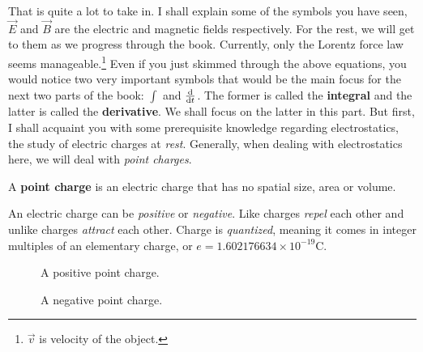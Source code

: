 That is quite a lot to take in. I shall explain some of the symbols you have seen, \(\vec{E}\) and \(\vec{B}\) are the electric and magnetic fields respectively. For the rest, we will get to them as we progress through the book. Currently, only the Lorentz force law seems manageable.\footnote{\(\vec{v}\) is velocity of the object.} Even if you just skimmed through the above equations, you would notice two very important symbols that would be the main focus for the next two parts of the book: \(\int\) and \(\odv{}{t}\). The former is called the \textbf{integral} and the latter is called the \textbf{derivative}. We shall focus on the latter in this part. But first, I shall acquaint you with some prerequisite knowledge regarding electrostatics, the study of electric charges at \emph{rest}. Generally, when dealing with electrostatics here, we will deal with \emph{point charges}.
\begin{definition}
  A \textbf{point charge} is an electric charge that has no spatial size, area or volume.
\end{definition}


An electric charge can be \emph{positive} or \emph{negative}. Like charges \emph{repel} each other and unlike charges \emph{attract} each other. Charge is \emph{quantized}, meaning it comes in integer multiples of an elementary charge, or \(e=1.602176634\times 10^{-19}\si{\coulomb}\).

\begin{figure}[H]
  \begin{center}
    \caption{A positive point charge.\protect\footnotemark}
  \end{center}
\end{figure}


\begin{figure}[H]
  \begin{center}
  \end{center}
  \caption{A negative point charge.}
\end{figure}

